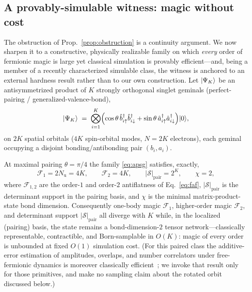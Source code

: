 \subsection{A provably-simulable witness: magic without cost}
\label{app:witness}
The obstruction of Prop.~\ref{prop:obstruction} is a continuity argument. We now sharpen it to a
constructive, physically realizable family on which \emph{every} order of fermionic magic is large yet
classical simulation is provably efficient---and, being a member of a recently characterized simulable
class, the witness is anchored to an external hardness result rather than to our own construction. Let
$\lvert \Psi_K \rangle$ be an antisymmetrized product of $K$ strongly orthogonal singlet geminals
(perfect-pairing / generalized-valence-bond),
\begin{equation}
\lvert \Psi_K \rangle\;=\;\bigotimes_{i=1}^{K}\Bigl(\cos\theta\,\hat b^{\dagger}_{i\uparrow}\hat b^{\dagger}_{i\downarrow}
+\sin\theta\,\hat a^{\dagger}_{i\uparrow}\hat a^{\dagger}_{i\downarrow}\Bigr)\lvert 0 \rangle,
\label{eq:apsg}
\end{equation}
on $2K$ spatial orbitals ($4K$ spin-orbital modes, $N=2K$ electrons), each geminal occupying a disjoint
bonding/antibonding pair $(b_i,a_i)$.

\begin{theorem}\label{thm:witness}
At maximal pairing $\theta=\pi/4$ the family \eqref{eq:apsg} satisfies, exactly,
\begin{equation}
\mathcal F_1=2N_{\mathrm u}=4K,\qquad \mathcal F_2=4K,\qquad
|\mathcal S|_{\mathrm{pair}}=2^{K},\qquad \chi=2,
\end{equation}
where $\mathcal F_{1,2}$ are the order-$1$ and order-$2$ antiflatness of Eq.~\eqref{eq:faf},
$|\mathcal S|_{\mathrm{pair}}$ is the determinant support in the pairing basis, and $\chi$ is the minimal
matrix-product-state bond dimension. Consequently one-body magic $\mathcal F_1$, higher-order magic
$\mathcal F_2$, and determinant support $|\mathcal S|_{\mathrm{pair}}$ all diverge with $K$ while, in the
localized (pairing) basis, the state remains a bond-dimension-$2$ tensor network---classically
representable, contractible, and Born-samplable in $O(K)$: magic of every order is unbounded at fixed
$O(1)$ simulation cost. (For this paired class the additive-error estimation of amplitudes, overlaps, and
number correlators under free-fermionic dynamics is moreover classically efficient~\cite{oh2026}; we
invoke that result only for those primitives, and make no sampling claim about the rotated orbit
discussed below.)
\end{theorem}

